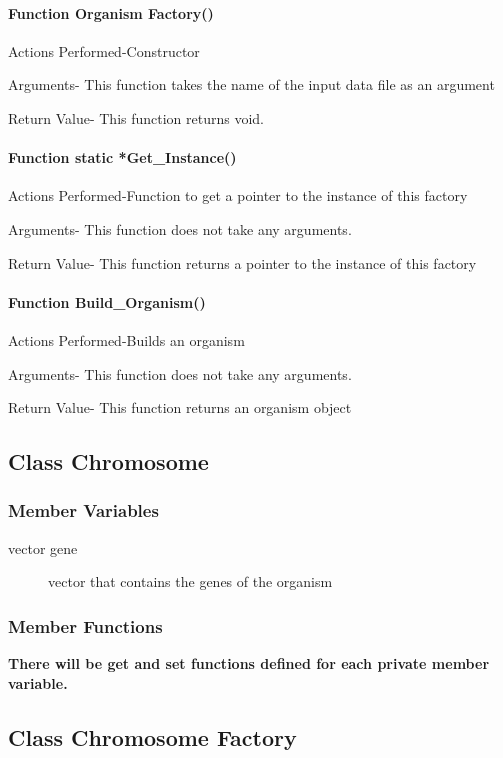 \documentclass{article}
\begin{document}
\paragraph{Function Organism Factory()}
Actions Performed-Constructor
                 
Arguments- This function takes the name of the input data file as an argument
                    
Return Value-  This function returns void.

\paragraph{Function static *Get\_Instance()}
Actions Performed-Function to get a pointer to the instance of this factory
                 
Arguments- This function does not take any arguments.
                    
Return Value- This function returns a pointer to the instance of this factory

\paragraph{Function Build\_Organism()}
Actions Performed-Builds an organism
                 
Arguments- This function does not take any arguments.
                    
Return Value- This function returns an organism object

\newpage
\subsection{Class Chromosome}
\subsubsection{Member Variables}
\begin{description}
\item[vector gene] vector that contains the genes of the organism
\end{description}
\subsubsection{Member Functions}
\textbf{There will be get and set functions defined for each private member variable.}

\newpage
\subsection{Class Chromosome Factory}
\end{document}
